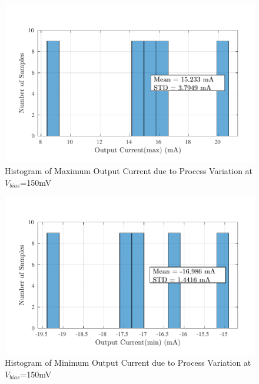 \begin{figure} [H]
\centering
\includegraphics[scale=1]{Figures/Corners/Overall/Proc_Min/PDFs/Proc_Min_imax.pdf}
\caption{Histogram of Maximum Output Current due to Process Variation at $V_{bias}$=150mV}
\end{figure}

\begin{figure} [H]
\centering
\includegraphics[scale=1]{Figures/Corners/Overall/Proc_Min/PDFs/Proc_Min_imin.pdf}
\caption{Histogram of Minimum Output Current due to Process Variation at $V_{bias}$=150mV}
\end{figure}

